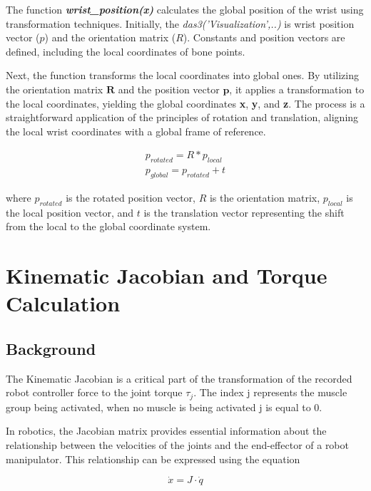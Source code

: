 The function \textbf{\textit{wrist\_position(x)}} calculates the global position of the wrist using transformation techniques. Initially, the \textit{das3('Visualization',..)} is wrist position vector ($p$) and the orientation matrix ($R$). Constants and position vectors are defined, including the local coordinates of bone points.

Next, the function transforms the local coordinates into global ones. By utilizing the orientation matrix $\textbf{R}$ and the position vector $\textbf{p}$, it applies a transformation to the local coordinates, yielding the global coordinates \textbf{x}, \textbf{y}, and \textbf{z}. The process is a straightforward application of the principles of rotation and translation, aligning the local wrist coordinates with a global frame of reference.

\begin{equation}
\begin{aligned}
    p_{rotated} = R*p_{local} \\
    p_{global} = p_{rotated} + t
\end{aligned}
\end{equation}

where $p_{rotated}$ is the rotated position vector, $R$ is the orientation matrix, $p_{local}$ is the local position vector, and $t$ is the translation vector representing the shift from the local to the global coordinate system.


\newpage
\section{Kinematic Jacobian and Torque Calculation} \label{sec:torque} 

\subsection{Background} 

The Kinematic Jacobian is a critical part of the transformation of the recorded robot controller force to the joint torque $\tau_j$. The index j represents the muscle group being activated, when no muscle is being activated j is equal to 0.

In robotics, the Jacobian matrix provides essential information about the relationship between the velocities of the joints and the end-effector of a robot manipulator. This relationship can be expressed using the equation

\begin{equation}
\dot{x} = J \cdot \dot{q}
\end{equation}

